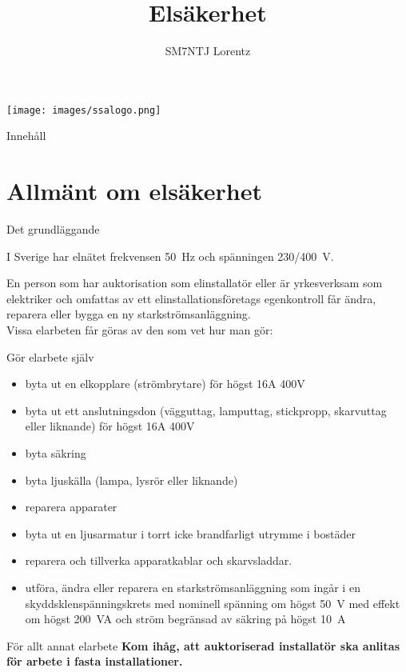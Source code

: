 \documentclass{beamer}
\title{Elsäkerhet}
\author{SM7NTJ Lorentz}
\begin{document}
\begin{frame}
\titlepage
\texttt{[image: images/ssalogo.png]}
\end{frame}

\begin{frame}{Innehåll}
\tableofcontents
\end{frame}

\section{Allmänt om elsäkerhet}

\begin{frame}{Det grundläggande}

I Sverige har elnätet frekvensen 50~Hz och spänningen 230/400~V.

En person som har auktorisation som elinstallatör eller är yrkesverksam som
elektriker och omfattas av ett elinstallationsföretags egenkontroll får ändra,
reparera eller bygga en ny starkströmsanläggning.\\
\vspace{5mm}
Vissa elarbeten får göras av den som vet hur man gör:
\end{frame}

\begin{frame}{Gör elarbete själv}
\begin{itemize}
	\item byta ut en elkopplare (strömbrytare) för högst 16A 400V
	\item byta ut ett anslutningsdon (vägguttag, lamputtag, stickpropp,
	skarvuttag eller liknande) för högst 16A 400V
	\item byta säkring
	\item byta ljuskälla (lampa, lysrör eller liknande)
	\item reparera apparater
	\item byta ut en ljusarmatur i torrt icke brandfarligt utrymme i bostäder
	\item reparera och tillverka apparatkablar och skarvsladdar.
	\item utföra, ändra eller reparera en starkströmsanläggning som ingår i en
	skyddsklenspänningskrets med nominell spänning om högst 50~V med effekt
	om högst 200~VA och ström begränsad av säkring på högst 10~A
\end{itemize}
\end{frame}

\begin{frame}{För allt annat elarbete}
\textbf{Kom ihåg, att auktoriserad installatör ska anlitas för arbete
	i fasta installationer.}
\end{frame}
\end{document}
